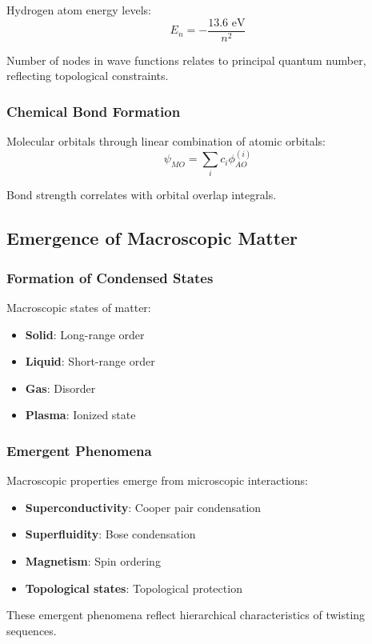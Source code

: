 \documentclass[11pt]{article}
\begin{document}
Hydrogen atom energy levels:
$$E_n = -\frac{13.6 \text{ eV}}{n^2}$$

Number of nodes in wave functions relates to principal quantum number, reflecting topological constraints.

\subsubsection{Chemical Bond Formation}

Molecular orbitals through linear combination of atomic orbitals:
$$\psi_{MO} = \sum_i c_i \phi_{AO}^{(i)}$$

Bond strength correlates with orbital overlap integrals.

\subsection{Emergence of Macroscopic Matter}

\subsubsection{Formation of Condensed States}

Macroscopic states of matter:
\begin{itemize}
\item \textbf{Solid}: Long-range order
\item \textbf{Liquid}: Short-range order
\item \textbf{Gas}: Disorder
\item \textbf{Plasma}: Ionized state
\end{itemize}

\subsubsection{Emergent Phenomena}

Macroscopic properties emerge from microscopic interactions:
\begin{itemize}
\item \textbf{Superconductivity}: Cooper pair condensation
\item \textbf{Superfluidity}: Bose condensation
\item \textbf{Magnetism}: Spin ordering
\item \textbf{Topological states}: Topological protection
\end{itemize}

These emergent phenomena reflect hierarchical characteristics of twisting sequences.
\end{document}
